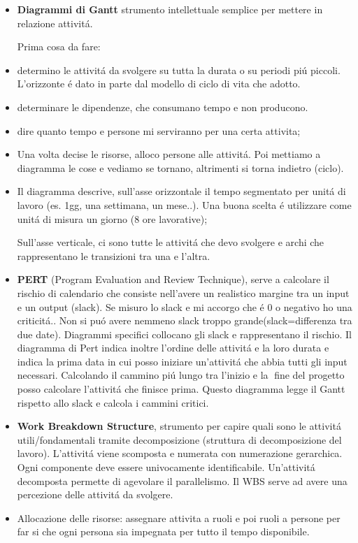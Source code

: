 \documentclass[10pt]{article}
\begin{document}
\begin{itemize}
\begin{itemize}
\begin{itemize}
\item \textbf{Diagrammi di Gantt} strumento intellettuale semplice per mettere 
in relazione attivit\'a. 

Prima cosa da fare: 

\item determino le attivit\'a da svolgere su tutta la durata o su periodi 
pi\'u piccoli. L'orizzonte \'e dato in parte dal modello di ciclo di vita che 
adotto.

\item determinare le dipendenze, che consumano tempo e non producono. 

\item dire quanto tempo e persone mi serviranno per una certa attivita;


\item Una volta decise le risorse, alloco persone alle attivit\'a. Poi mettiamo 
a diagramma le cose e vediamo se tornano, altrimenti si torna indietro (ciclo). 

\item Il diagramma descrive, sull'asse orizzontale il tempo segmentato per
unit\'a di lavoro (es. 1gg, una settimana, un mese..). Una buona scelta \'e 
utilizzare come unit\'a di misura un giorno (8 ore lavorative); 

Sull'asse verticale, ci sono tutte le attivit\'a che devo svolgere e archi che 
rappresentano le transizioni tra una e l'altra.



\item \textbf{PERT} (Program Evaluation and Review Technique), serve a 
calcolare il rischio di calendario che consiste nell'avere un realistico 
margine tra un input e un output (slack). Se misuro lo slack e mi accorgo che 
\'e 0 o negativo ho una criticit\'a.. Non si pu\'o avere nemmeno
slack troppo grande(slack=differenza tra due date). Diagrammi specifici 
collocano gli slack e rappresentano il rischio. Il diagramma di Pert indica 
inoltre l'ordine delle attivit\'a e la loro durata e indica la prima data in 
cui posso iniziare un'attivit\'a che abbia tutti gli input necessari. 
Calcolando il cammino pi\'u lungo tra l'inizio e la fine  del progetto 
posso calcolare l'attivit\'a che finisce prima. Questo diagramma legge il Gantt 
rispetto allo slack e calcola i 
cammini critici.


\item \textbf{Work Breakdown Structure}, strumento per capire 
quali sono le attivit\'a utili/fondamentali tramite decomposizione (struttura 
di decomposizione del lavoro). L'attivit\'a viene scomposta e numerata con 
numerazione gerarchica. Ogni componente deve essere univocamente identificabile.
Un'attivit\'a decomposta permette di agevolare il parallelismo. Il WBS 
serve ad avere una percezione delle attivit\'a da svolgere.
\item Allocazione delle risorse: 
assegnare attivita a ruoli e poi ruoli a persone per far si che ogni persona 
sia impegnata per tutto il tempo disponibile. 


\end{itemize}
\end{itemize}
\end{itemize}
\end{document}
